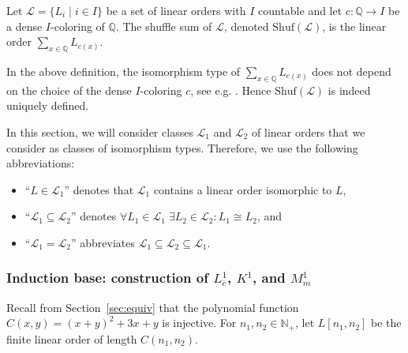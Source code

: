 \documentclass[envcountsame]{llncs}
\renewcommand{\L}{\mathcal L}
\newcommand{\N}{\mathbb N}
\renewcommand{\L}{\mathcal L}
\newcommand{\Q}{\mathbb Q}
\newcommand{\Shuf}{\mathrm{Shuf}}
\begin{document}
\begin{definition}
Let $\L=\{L_i\mid i\in I\}$ be a set of linear orders with $I$ countable and let $c:\Q\rightarrow I$ 
be a dense $I$-coloring of $\Q$. The shuffle sum of $\L$, denoted $\Shuf(\L)$, is the linear order $\sum_{x\in \Q} L_{c(x)}$.
\end{definition}
In the above definition, the isomorphism type of $\sum_{x\in \Q}
L_{c(x)}$ does not depend on the choice of the dense $I$-coloring $c$,
see e.g. \cite{Ros82}. Hence $\Shuf(\L)$ is indeed uniquely defined.

In this section, we will consider classes $\L_1$ and $\L_2$ of linear
orders that we consider as classes of isomorphism types. Therefore, we
use the following abbreviations:
\begin{itemize}
\item ``$L\in\L_1$'' denotes that $\L_1$ contains a linear order
  isomorphic to $L$,
\item ``$\L_1\subseteq\L_2$'' denotes $\forall L_1\in\L_1\;\exists
  L_2\in\L_2:L_1\cong L_2$, and
\item ``$\L_1=\L_2$'' abbreviates $\L_1\subseteq\L_2\subseteq\L_1$.
\end{itemize}


\subsubsection{Induction base: construction of $L^1_{\overline{c}}$, $K^1$, and $M^1_m$}
\label{construction-lo-ind-base}

Recall from Section~\ref{sec:equiv} that the polynomial function $C(x,y)=(x+y)^2+3x+y$
is injective. 
For $n_1, n_2 \in \N_+$, let $L[n_1, n_2]$ be the finite linear order of length $C(n_1, n_2)$. 
\end{document}

